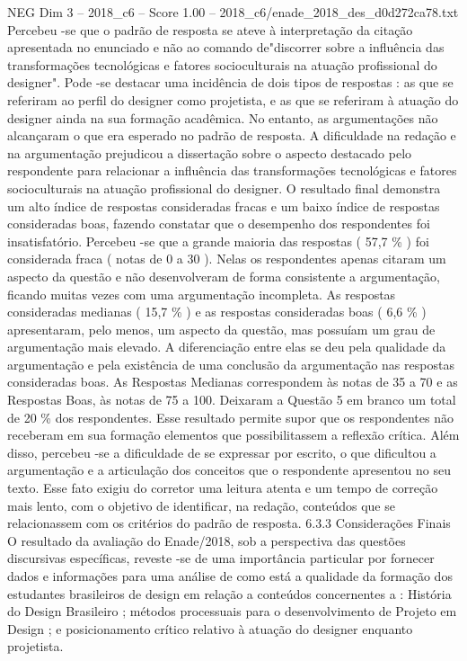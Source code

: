 \begin{textsample}{NEG Dim 3 – 2018\_c6 – Score 1.00 – 2018\_c6/enade\_2018\_des\_d0d272ca78.txt}
Percebeu -se que o padrão de resposta se ateve à interpretação da citação apresentada no enunciado e não ao comando de"discorrer sobre a influência das transformações tecnológicas e fatores socioculturais na atuação profissional do designer".
Pode -se destacar uma incidência de dois tipos de respostas : as que se referiram ao perfil do designer como projetista, e as que se referiram à atuação do designer ainda na sua formação acadêmica.
No entanto, as argumentações não alcançaram o que era esperado no padrão de resposta.
A dificuldade na redação e na argumentação prejudicou a dissertação sobre o aspecto destacado pelo respondente para relacionar a influência das transformações tecnológicas e fatores socioculturais na atuação profissional do designer.
O resultado final demonstra um alto índice de respostas consideradas fracas e um baixo índice de respostas consideradas boas, fazendo constatar que o desempenho dos respondentes foi insatisfatório.
Percebeu -se que a grande maioria das respostas ( 57,7 \% ) foi considerada fraca ( notas de 0 a 30 ).
Nelas os respondentes apenas citaram um aspecto da questão e não desenvolveram de forma consistente a argumentação, ficando muitas vezes com uma argumentação incompleta.
As respostas consideradas medianas ( 15,7 \% ) e as respostas consideradas boas ( 6,6 \% ) apresentaram, pelo menos, um aspecto da questão, mas possuíam um grau de argumentação mais elevado.
A diferenciação entre elas se deu pela qualidade da argumentação e pela existência de uma conclusão da argumentação nas respostas consideradas boas.
As Respostas Medianas correspondem às notas de 35 a 70 e as Respostas Boas, às notas de 75 a 100.
Deixaram a Questão 5 em branco um total de 20 \% dos respondentes.
Esse resultado permite supor que os respondentes não receberam em sua formação elementos que possibilitassem a reflexão crítica.
Além disso, percebeu -se a dificuldade de se expressar por escrito, o que dificultou a argumentação e a articulação dos conceitos que o respondente apresentou no seu texto.
Esse fato exigiu do corretor uma leitura atenta e um tempo de correção mais lento, com o objetivo de identificar, na redação, conteúdos que se relacionassem com os critérios do padrão de resposta. 6.3.3 Considerações Finais O resultado da avaliação do Enade/2018, sob a perspectiva das questões discursivas específicas, reveste -se de uma importância particular por fornecer dados e informações para uma análise de como está a qualidade da formação dos estudantes brasileiros de design em relação a conteúdos concernentes a : História do Design Brasileiro ; métodos processuais para o desenvolvimento de Projeto em Design ; e posicionamento crítico relativo à atuação do designer enquanto projetista.

\end{textsample}
